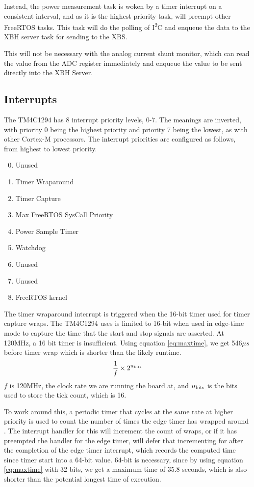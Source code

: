\documentclass[twoside,11pt]{cergdoc}
\newcommand{\ITwoC}{I\textsuperscript{2}C }
\begin{document}
Instead, the power measurement task is woken by a timer interrupt on a
consistent interval, and as it is the highest priority task, will preempt other
FreeRTOS tasks. This task will do the polling of \ITwoC and enqueue the data to
the XBH server task for sending to the XBS.


This will not be necessary with the analog current shunt monitor, which can read the
value from the ADC register immediately and enqueue the value to be sent
directly into the XBH Server. 


    \subsection{Interrupts}
The TM4C1294 has 8 interrupt priority levels, 0-7. The meanings are inverted, with
priority 0 being the highest priority and priority 7 being the lowest, as with
other Cortex-M processors. The interrupt priorities are configured as follows,
from highest to lowest priority.
\begin{enumerate}
    \setcounter{enumi}{-1}
    \item Unused 
    \item Timer Wraparound
    \item Timer Capture 
    \item Max FreeRTOS SysCall Priority
    \setcounter{enumi}{2}
    \item Power Sample Timer
    \item Watchdog
    \item Unused 
    \item Unused 
    \item FreeRTOS kernel
\end{enumerate}

The timer wraparound interrupt is triggered when the 16-bit timer used for timer
capture wraps. The TM4C1294 uses is limited to 16-bit when used in edge-time
mode to capture the time that the start and stop signals are asserted. At
120MHz, a 16 bit timer is insufficient. Using equation \ref{eq:maxtime}, we get
546$\mu s$ before timer wrap which is shorter than the likely runtime.
\begin{equation}
    \label{eq:maxtime}
    \frac{1 }{f}\times 2^{n_{\rm bits}}
\end{equation}
$f$ is 120MHz, the clock rate we are running the board at, and $n_{\rm bits}$ is
the bits used to store the tick count, which is 16.

To work around this, a periodic timer that cycles at the same rate at higher priority is
used to count the number of times the edge timer has wrapped around \cite{tm4c1294}.
The interrupt handler for this will increment the count of wraps, or if it has
preempted the handler for the edge timer, will defer that incrementing for after
the completion of the edge timer interrupt, which records the computed time
since timer start into a 64-bit value. 64-bit is necessary, since by using equation
\ref{eq:maxtime} with 32 bits, we get a maximum time of 35.8 seconds, which is
also shorter than the potential longest time of execution.
\end{document}
